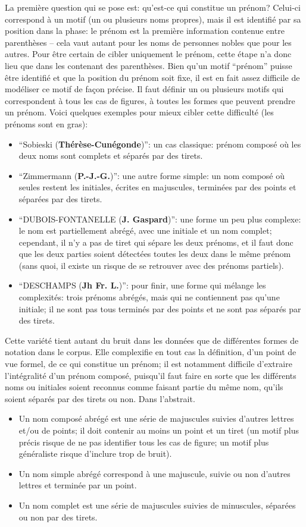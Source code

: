 La première question qui se pose est: qu'est-ce qui constitue un prénom? Celui-ci correspond à un motif (un ou plusieurs noms propres), mais il est identifié par sa position dans la phase: le prénom est la première information contenue entre parenthèses -- cela vaut autant pour les noms de personnes nobles que pour les autres. Pour être certain de cibler uniquement le prénom, cette étape n'a donc lieu que dans les \tname{} contenant des parenthèses. Bien qu'un motif \enquote{prénom} puisse être identifié et que la position du prénom soit fixe, il est en fait assez difficile de modéliser ce motif de façon précise. Il faut définir un ou plusieurs motifs qui correspondent à tous les cas de figures, à toutes les formes que peuvent prendre un prénom. Voici quelques exemples pour mieux cibler cette difficulté (les prénoms sont en gras):
\begin{itemize}
	\item \enquote{Sobieski (\textbf{Thérèse-Cunégonde})}: un cas classique: prénom composé où les deux noms sont complets et séparés par des tirets.
	\item \enquote{Zimmermann (\textbf{P.-J.-G.})}: une autre forme simple: un nom composé où seules restent les initiales, écrites en majuscules, terminées par des points et séparées par des tirets.
	\item \enquote{DUBOIS-FONTANELLE (\textbf{J. Gaspard})}: une forme un peu plus complexe: le nom est partiellement abrégé, avec une initiale et un nom complet; cependant, il n'y a pas de tiret qui sépare les deux prénoms, et il faut donc que les deux parties soient détectées toutes les deux dans le même prénom (sans quoi, il existe un risque de se retrouver avec des prénoms partiels).
	\item \enquote{DESCHAMPS (\textbf{Jh Fr. L.})}: pour finir, une forme qui mélange les complexités: trois prénoms abrégés, mais qui ne contiennent pas qu'une initiale; il ne sont pas tous terminés par des points et ne sont pas séparés par des tirets.
\end{itemize}

Cette variété tient autant du bruit dans les données que de différentes formes de notation dans le corpus. Elle complexifie en tout cas la définition, d'un point de vue formel, de ce qui constitue un prénom; il est notamment difficile d'extraire l'intégralité d'un prénom composé, puisqu'il faut faire en sorte que les différents noms ou initiales soient reconnus comme faisant partie du même nom, qu'ils soient séparés par des tirets ou non. Dans l'abstrait.
\begin{itemize}
	\item Un nom composé abrégé est une série de majuscules suivies d'autres lettres et/ou de points; il doit contenir au moins un point et un tiret (un motif plus précis risque de ne pas identifier tous les cas de figure; un motif plus généraliste risque d'inclure trop de bruit).
	\item Un nom simple abrégé correspond à une majuscule, suivie ou non d'autres lettres et terminée par un point.
	\item Un nom complet est une série de majuscules suivies de minuscules, séparées ou non par des tirets.
\end{itemize}


